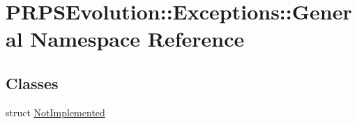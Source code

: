 \hypertarget{namespace_p_r_p_s_evolution_1_1_exceptions_1_1_general}{\section{\-P\-R\-P\-S\-Evolution\-:\-:\-Exceptions\-:\-:\-General \-Namespace \-Reference}
\label{namespace_p_r_p_s_evolution_1_1_exceptions_1_1_general}
}
\subsection*{\-Classes}
\begin{DoxyCompactItemize}
\item 
struct \hyperlink{struct_p_r_p_s_evolution_1_1_exceptions_1_1_general_1_1_not_implemented}{\-Not\-Implemented}
\end{DoxyCompactItemize}
